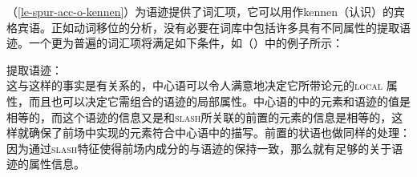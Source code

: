 （\ref{le-spur-acc-o-kennen}）为语迹提供了词汇项，它可以用作kennen（认识）的宾格宾语。正如动词移位的分析，没有必要在词库中包括许多具有不同属性的提取语迹。一个更为普遍的词汇项将满足如下条件，如（）中的例子所示：

\eas
\label{le-extraktionsspur}
提取语迹：\\
\zs
这与这样的事实是有关系的，中心语可以令人满意地决定它所带论元的\textsc{local} 属性，而且也可以决定它需组合的语迹的局部属性。中心语的\subcatlc 中的元素和语迹的\synsemc 值是相等的，而这个语迹的信息又是和\textsc{slash}所关联的前置的元素的信息是相等的，这样就确保了前场中实现的元素符合中心语\subcatlc 中的描写。前置的状语也做同样的处理：因为通过\textsc{slash}特征使得前场内成分的\localvc 与语迹的\localvc 保持一致，那么就有足够的关于语迹的属性信息。

